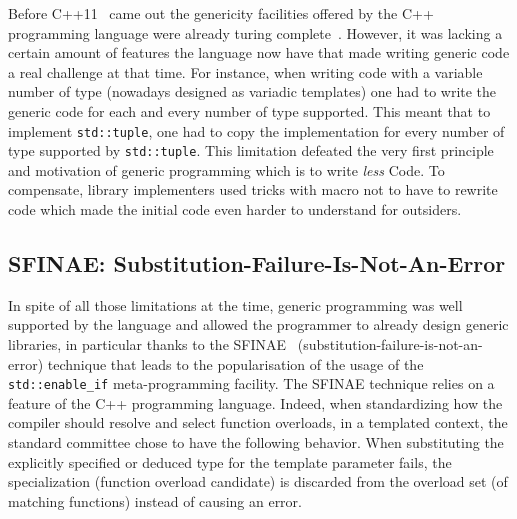 Before C++11~\parencite{iso.2011.cpp} came out the genericity facilities offered by the C++ programming language were
already turing complete~\parencite{veldhuizen.2003.c++templates}. However, it was lacking a certain amount of features
the language now have that made writing generic code a real challenge at that time. For instance, when writing code with
a variable number of type (nowadays designed as variadic templates) one had to write the generic code for each and every
number of type supported. This meant that to implement \texttt{std::tuple}, one had to copy the implementation for every
number of type supported by \texttt{std::tuple}. This limitation defeated the very first principle and motivation of
generic programming which is to write \emph{less} Code. To compensate, library implementers used tricks with macro not
to have to rewrite code which made the initial code even harder to understand for outsiders.

\subsection{SFINAE: Substitution-Failure-Is-Not-An-Error}
\label{subsec:sfinae}

In spite of all those limitations at the time, generic programming was well supported by the language and allowed the
programmer to already design generic libraries, in particular thanks to the SFINAE~\parencite{vandevoorde.2002.c++}
(substitution-failure-is-not-an-error) technique that leads to the popularisation of the usage of the
\texttt{std::enable\_if} meta-programming facility. The SFINAE technique relies on a feature of the C++ programming
language. Indeed, when standardizing how the compiler should resolve and select function overloads, in a templated
context, the standard committee chose to have the following behavior. When substituting the explicitly specified or
deduced type for the template parameter fails, the specialization (function overload candidate) is discarded from the
overload set (of matching functions) instead of causing an error.

